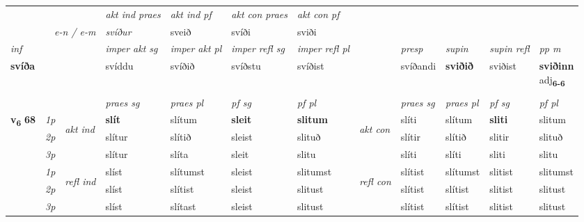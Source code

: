 \begin{longtable}[l]{X>{\footnotesize\itshape}llXXXXlXXXX}
   && &  \textit{akt ind praes} & \textit{akt ind pf} & \textit{akt con praes} & \textit{akt con pf} \\*
\multicolumn{3}{r}{\textit{e-n  /  e-m}} & svíður & sveið & svíði & sviði \\*

\cmidrule{4-7}
   {\textit{inf}} & &  & \textit{imper akt sg} & \textit{imper akt pl} & \textit{imper refl sg} & \textit{imper refl pl} && \textit{presp} & \textit{supin} & \textit{supin refl} & \textit{pp m} \\*
  {\textbf{svíða}} & && svíddu  & svíðið & svíðstu & svíðist && svíðandi &  \textbf{sviðið} & sviðist & \specialcell{\textbf{sviðinn} \\ adj\textbf{\textsubscript{6-6}}} \\*

\midrule

  & \\
   \midrule
 & &   & \textit{praes sg}  & \textit{praes pl}    & \textit{ pf sg} & \textit{pf pl} & & \textit{praes sg}  & \textit{praes pl}    & \textit{pf sg} & \textit{pf pl }  \\ \cmidrule{4-7} \cmidrule{9-12}
 \multirow{2}{*}{{{\textbf{v{\textsubscript{6}}} \Large{\textbf{68}}}}}  & 1p & \multirow{3}{*}{\begin{turn}{90}\textit{akt ind}\end{turn}} & \textbf{slít} & slítum & \textbf{sleit} & \textbf{slitum} & \multirow{3}{*}{\begin{turn}{90}\textit{akt con}\end{turn}} &slíti & slítum & \textbf{sliti} & slitum\\*
 & 2p &  &  slítur  & slítið & sleist & slituð & & slítir & slítið & slitir & slituð \\*
 & 3p &  & slítur & slíta & sleit & slitu & & slíti & slíti& sliti & slitu \\*
\cmidrule{4-7} \cmidrule{9-12}
 & 1p & \multirow{3}{*}{\begin{turn}{90}\textit{refl ind}\end{turn}}  & slíst & slítumst & sleist & slitumst & \multirow{3}{*}{\begin{turn}{90}\textit{refl con}\end{turn}}  &slítist & slítumst & slitist & slitumst \\*
 & 2p &  & slíst & slítist & sleist & slitust & &slítist & slítist & slitist & slitust \\*
 & 3p  & & slíst & slítast & sleist & slitust & & slítist & slítist& slitist & slitust \\*
\cmidrule{4-7} \cmidrule{9-12}


\end{longtable}
